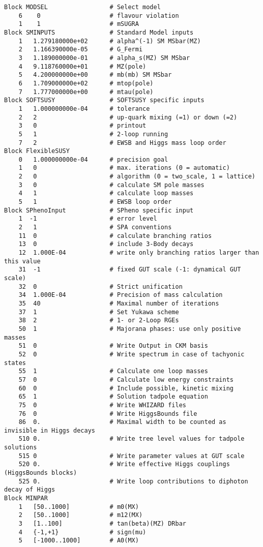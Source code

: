 \documentclass[final,3p,times,pdflatex]{elsarticle}
\begin{document}
\begin{verbatim}
Block MODSEL                 # Select model
    6    0                   # flavour violation
    1    1                   # mSUGRA
Block SMINPUTS               # Standard Model inputs
    1   1.279180000e+02      # alpha^(-1) SM MSbar(MZ)
    2   1.166390000e-05      # G_Fermi
    3   1.189000000e-01      # alpha_s(MZ) SM MSbar
    4   9.118760000e+01      # MZ(pole)
    5   4.200000000e+00      # mb(mb) SM MSbar
    6   1.709000000e+02      # mtop(pole)
    7   1.777000000e+00      # mtau(pole)
Block SOFTSUSY               # SOFTSUSY specific inputs
    1   1.000000000e-04      # tolerance
    2   2                    # up-quark mixing (=1) or down (=2)
    3   0                    # printout
    5   1                    # 2-loop running
    7   2                    # EWSB and Higgs mass loop order
Block FlexibleSUSY
    0   1.000000000e-04      # precision goal
    1   0                    # max. iterations (0 = automatic)
    2   0                    # algorithm (0 = two_scale, 1 = lattice)
    3   0                    # calculate SM pole masses
    4   1                    # calculate loop masses
    5   1                    # EWSB loop order
Block SPhenoInput            # SPheno specific input
    1  -1                    # error level
    2   1                    # SPA conventions
    11  0                    # calculate branching ratios
    13  0                    # include 3-Body decays
    12  1.000E-04            # write only branching ratios larger than this value
    31  -1                   # fixed GUT scale (-1: dynamical GUT scale)
    32  0                    # Strict unification
    34  1.000E-04            # Precision of mass calculation
    35  40                   # Maximal number of iterations
    37  1                    # Set Yukawa scheme
    38  2                    # 1- or 2-Loop RGEs
    50  1                    # Majorana phases: use only positive masses
    51  0                    # Write Output in CKM basis
    52  0                    # Write spectrum in case of tachyonic states
    55  1                    # Calculate one loop masses
    57  0                    # Calculate low energy constraints
    60  0                    # Include possible, kinetic mixing
    65  1                    # Solution tadpole equation
    75  0                    # Write WHIZARD files
    76  0                    # Write HiggsBounds file
    86  0.                   # Maximal width to be counted as invisible in Higgs decays
    510 0.                   # Write tree level values for tadpole solutions
    515 0                    # Write parameter values at GUT scale
    520 0.                   # Write effective Higgs couplings (HiggsBounds blocks)
    525 0.                   # Write loop contributions to diphoton decay of Higgs
Block MINPAR
    1   [50..1000]           # m0(MX)
    2   [50..1000]           # m12(MX)
    3   [1..100]             # tan(beta)(MZ) DRbar
    4   {-1,+1}              # sign(mu)
    5   [-1000..1000]        # A0(MX)
\end{verbatim}
\end{document}

